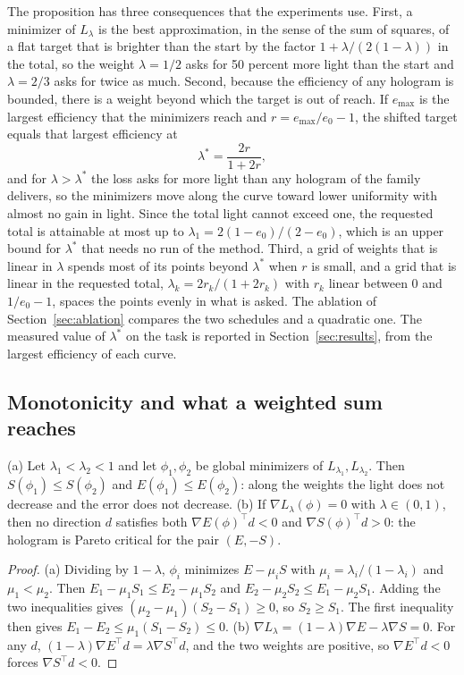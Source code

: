 The proposition has three consequences that the experiments use. First, a minimizer of $L_\lambda$ is the best approximation, in the sense of the sum of squares, of a flat target that is brighter than the start by the factor $1+\lambda/(2(1-\lambda))$ in the total, so the weight $\lambda=1/2$ asks for 50 percent more light than the start and
$\lambda=2/3$ asks for twice as much. Second, because the efficiency of any hologram is bounded, there is a weight beyond which the target is out of reach. If $e_{\max}$ is the largest efficiency that the minimizers reach and $r=e_{\max}/e_0-1$, the shifted target equals that largest efficiency at
\begin{equation}
\lambda^\ast=\frac{2r}{1+2r},\label{eq:lamstar}
\end{equation}
and for $\lambda>\lambda^\ast$ the loss asks for more light than any hologram of the family delivers, so the minimizers move along the curve toward lower uniformity with almost no gain in light. Since the total light cannot exceed one, the requested total is attainable at most up to $\lambda_1=2(1-e_0)/(2-e_0)$, which is
an upper bound for $\lambda^\ast$ that needs no run of the method. Third, a grid of weights that is linear in $\lambda$ spends most of its points beyond $\lambda^\ast$ when $r$ is small, and a grid that is linear in the requested total, $\lambda_k=2r_k/(1+2r_k)$ with $r_k$ linear between $0$ and $1/e_0-1$, spaces the points evenly in what is asked.
The ablation of Section~\ref{sec:ablation} compares the two schedules and a quadratic one. The measured value of $\lambda^\ast$ on the task is reported in Section~\ref{sec:results}, from the largest efficiency of each curve.

\subsection{Monotonicity and what a weighted sum reaches}

\begin{proposition}\label{prop:mono}
(a) Let $\lambda_1<\lambda_2<1$ and let $\phi_1,\phi_2$ be global minimizers of $L_{\lambda_1},L_{\lambda_2}$. Then $S(\phi_1)\le S(\phi_2)$ and $E(\phi_1)\le E(\phi_2)$: along the weights the light does not decrease and the error does not decrease.
(b) If $\nabla L_\lambda(\phi)=0$ with $\lambda\in(0,1)$, then no direction $d$ satisfies both $\nabla E(\phi)^{\top}d<0$ and $\nabla S(\phi)^{\top}d>0$: the hologram is Pareto critical for the pair $(E,-S)$.
\end{proposition}
\begin{proof}
(a) Dividing by $1-\lambda$, $\phi_i$ minimizes $E-\mu_iS$ with $\mu_i=\lambda_i/(1-\lambda_i)$ and $\mu_1<\mu_2$. Then $E_1-\mu_1S_1\le E_2-\mu_1S_2$ and $E_2-\mu_2S_2\le E_1-\mu_2S_1$. Adding the two inequalities gives $(\mu_2-\mu_1)(S_2-S_1)\ge0$, so $S_2\ge S_1$. The first inequality then gives $E_1-E_2\le\mu_1(S_1-S_2)\le0$.
(b) $\nabla L_\lambda=(1-\lambda)\nabla E-\lambda\nabla S=0$. For any $d$, $(1-\lambda)\nabla E^{\top}d=\lambda\nabla S^{\top}d$, and the two weights are positive, so $\nabla E^{\top}d<0$ forces $\nabla S^{\top}d<0$.
\end{proof}

